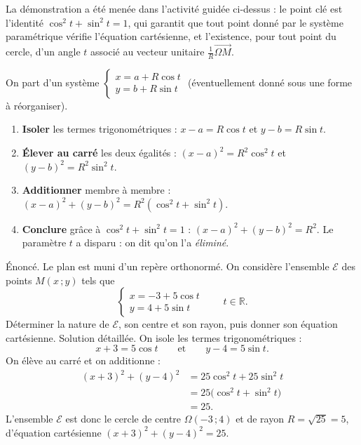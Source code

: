 \documentclass[11pt]{article}
\begin{document}
La démonstration a été menée dans l'activité guidée ci-dessus : le point clé est l'identité $\cos^2 t+\sin^2 t=1$, qui garantit que tout point donné par le système paramétrique vérifie l'équation cartésienne, et l'existence, pour tout point du cercle, d'un angle $t$ associé au vecteur unitaire $\frac{1}{R}\overrightarrow{\Omega M}$.

\begin{methode}
On part d'un système $\begin{cases} x = a + R\cos t \\ y = b + R\sin t \end{cases}$ (éventuellement donné sous une forme à réorganiser).
\begin{enumerate}
\item \textbf{Isoler} les termes trigonométriques : $x-a = R\cos t$ et $y-b = R\sin t$.
\item \textbf{Élever au carré} les deux égalités : $(x-a)^2=R^2\cos^2 t$ et $(y-b)^2=R^2\sin^2 t$.
\item \textbf{Additionner} membre à membre : $(x-a)^2+(y-b)^2 = R^2(\cos^2 t+\sin^2 t)$.
\item \textbf{Conclure} grâce à $\cos^2 t+\sin^2 t=1$ : $(x-a)^2+(y-b)^2=R^2$. Le paramètre $t$ a disparu : on dit qu'on l'a \emph{éliminé}.
\end{enumerate}
\end{methode}

\begin{exoresolu}
Énoncé. Le plan est muni d'un repère orthonormé. On considère l'ensemble $\mathcal{E}$ des points $M(x\,;y)$ tels que
\[
\begin{cases}
x = -3 + 5\cos t \\
y = 4 + 5\sin t
\end{cases}
\qquad t\in\mathbb{R}.
\]
Déterminer la nature de $\mathcal{E}$, son centre et son rayon, puis donner son équation cartésienne.
\tcblower
Solution détaillée. On isole les termes trigonométriques :
\[
x+3 = 5\cos t \qquad\text{et}\qquad y-4 = 5\sin t.
\]
On élève au carré et on additionne :
\begin{align*}
(x+3)^2+(y-4)^2 &= 25\cos^2 t + 25\sin^2 t \\
&= 25\big(\cos^2 t+\sin^2 t\big) \\
&= 25.
\end{align*}
L'ensemble $\mathcal{E}$ est donc le cercle de centre $\Omega(-3\,;4)$ et de rayon $R=\sqrt{25}=5$, d'équation cartésienne $(x+3)^2+(y-4)^2=25$.
\end{exoresolu}
\end{document}
